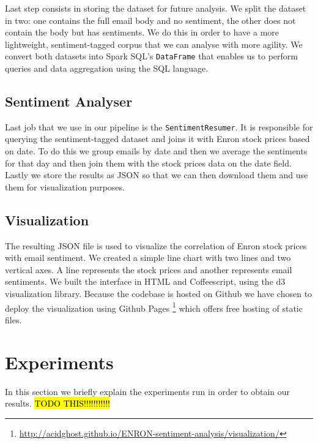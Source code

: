 \documentclass{vldb}
\newcommand{\hlc}[2][lightcyan]{{\sethlcolor{#1}\hl{#2}}}
\begin{document}
Last step consists in storing the dataset for future analysis. We split the
dataset in two: one contains the full email body and no sentiment, the other
does not contain the body but has sentiments. We do this in order to have a more
lightweight, sentiment-tagged corpus that we can analyse with more agility. We
convert both datasets into Spark SQL's \texttt{DataFrame} that enables us to
perform queries and data aggregation using the SQL language.

\subsection{Sentiment Analyser}
\label{sub-sec:sentiment-analyser}
Last job that we use in our pipeline is the \texttt{SentimentResumer}. It is
responsible for querying the sentiment-tagged dataset and joins it with Enron
stock prices based on date. To do this we group emails by date and then we
average the sentiments for that day and then join them with the stock prices
data on the date field. Lastly we store the results as JSON so that we can
then download them and use them for visualization purposes.

\subsection{Visualization}
\label{sub-sec:visualization}
The resulting JSON file is used to visualize the correlation of Enron stock
prices with email sentiment. We created a simple line chart with two lines and
two vertical axes. A line represents the stock prices and another represents
email sentiments. We built the interface in HTML and Coffeescript, using the d3
visualization library. Because the codebase is hosted on Github we have chosen
to deploy the visualization using Github Pages
\footnote{\url{http://acidghost.github.io/ENRON-sentiment-analysis/visualization/}}
which offers free hosting of static files.

\section{Experiments}
\label{sec:exp}
In this section we briefly explain the experiments run in order to obtain our results.
\hlc{TODO THIS!!!!!!!!!!!}
\end{document}
